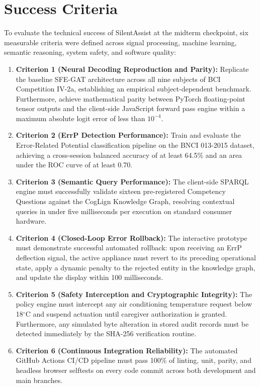 \documentclass[12pt,a4paper]{report}
\begin{document}
\section{Success Criteria}
To evaluate the technical success of SilentAssist at the midterm checkpoint, six measurable criteria were defined across signal processing, machine learning, semantic reasoning, system safety, and software quality:
\begin{enumerate}[leftmargin=1.5em]
    \item \textbf{Criterion 1 (Neural Decoding Reproduction and Parity):} Replicate the baseline SFE-GAT architecture across all nine subjects of BCI Competition IV-2a, establishing an empirical subject-dependent benchmark. Furthermore, achieve mathematical parity between PyTorch floating-point tensor outputs and the client-side JavaScript forward pass engine within a maximum absolute logit error of less than $10^{-4}$.
    \item \textbf{Criterion 2 (ErrP Detection Performance):} Train and evaluate the Error-Related Potential classification pipeline on the BNCI 013-2015 dataset, achieving a cross-session balanced accuracy of at least 64.5\% and an area under the ROC curve of at least 0.70.
    \item \textbf{Criterion 3 (Semantic Query Performance):} The client-side SPARQL engine must successfully validate sixteen pre-registered Competency Questions against the CogLign Knowledge Graph, resolving contextual queries in under five milliseconds per execution on standard consumer hardware.
    \item \textbf{Criterion 4 (Closed-Loop Error Rollback):} The interactive prototype must demonstrate successful automated rollback: upon receiving an ErrP deflection signal, the active appliance must revert to its preceding operational state, apply a dynamic penalty to the rejected entity in the knowledge graph, and update the display within 100 milliseconds.
    \item \textbf{Criterion 5 (Safety Interception and Cryptographic Integrity):} The policy engine must intercept any air conditioning temperature request below 18$^\circ$C and suspend actuation until caregiver authorization is granted. Furthermore, any simulated byte alteration in stored audit records must be detected immediately by the SHA-256 verification routine.
    \item \textbf{Criterion 6 (Continuous Integration Reliability):} The automated GitHub Actions CI/CD pipeline must pass 100\% of linting, unit, parity, and headless browser selftests on every code commit across both development and main branches.
\end{enumerate}
\end{document}
